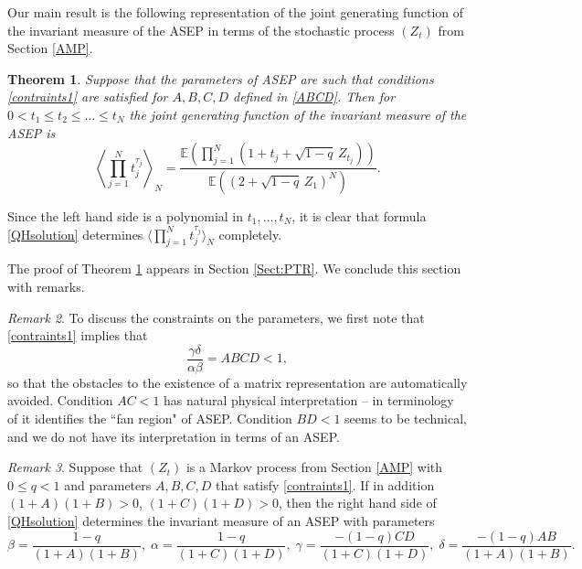 \documentclass{amsart}
\newtheorem{theorem}{Theorem}[section]
\theoremstyle{definition}
\theoremstyle{remark}
\newtheorem{remark}[theorem]{Remark}
\theoremstyle{remark}
\theoremstyle{definition}
\numberwithin{equation}{section}
\begin{document}
Our main result is the following representation of the joint generating function of the invariant measure of the ASEP in terms of the stochastic process $(Z_t)$ from Section \ref{AMP}.
\begin{theorem}
  \label{T-rep}
Suppose that the parameters of ASEP are such that conditions \eqref{contraints1} are satisfied for $A,B,C,D$ defined in
\eqref{ABCD}. Then for $0<t_1\leq t_2\leq \dots\leq t_N$ the joint generating function of the invariant measure of the ASEP  is
  \begin{equation}\label{QHsolution}
\left\langle \prod_{j=1}^N t_j^{\tau_j}\right\rangle_N=\frac{{\mathds{E}}\left(\prod_{j=1}^N(1+t_j+\sqrt{1-q}\,Z_{t_j})\right)}{{\mathds{E}}\left((2+\sqrt{1-q}\,Z_1)^N\right)}.
  \end{equation}
 \end{theorem}
Since the left hand side is a polynomial in $t_1,\dots,t_N$, it is clear that formula \eqref{QHsolution} determines $\langle \prod_{j=1}^N t_j^{\tau_j}\rangle_N$ completely.

The proof of Theorem \ref{T-rep} appears  in Section \ref{Sect:PTR}. We conclude this section with  remarks.
 \begin{remark}\label{Rem:interpret}
To discuss the constraints on the parameters, we first note that \eqref{contraints1} implies that
$$\frac{\gamma\delta}{\alpha\beta}=ABCD<1,$$
so that the obstacles \cite[page 1384]{essler1996representations} to the existence of a matrix representation are automatically
avoided. Condition $AC<1$ has natural physical interpretation -- in terminology of \cite{derrida2003exact}
 it identifies the ``fan region" of ASEP. Condition $BD<1$  seems to be technical, and we do not have its interpretation in terms of an
ASEP.
\end{remark}

\begin{remark}
Suppose that $(Z_t)$ is a Markov process from Section \ref{AMP} with $0\leq q<1$ and parameters $A,B,C,D$ that
  satisfy \eqref{contraints1}. If in addition
$(1+A)(1+B)>0$, $(1+C)(1+D)>0$, then the right hand side of \eqref{QHsolution} determines the invariant measure of an ASEP with
parameters
\begin{equation}
  \label{Jacek}
  \beta=\frac{1-q}{(1+A)(1+B)},
\; \alpha=\frac{1-q}{(1+C)(1+D)}, \; \gamma=\frac{-(1-q) CD}{(1+C)(1+D)}, \; \delta=\frac{-(1-q)AB}{(1+A)(1+B)}.
\end{equation}
\end{remark}
\end{document}

